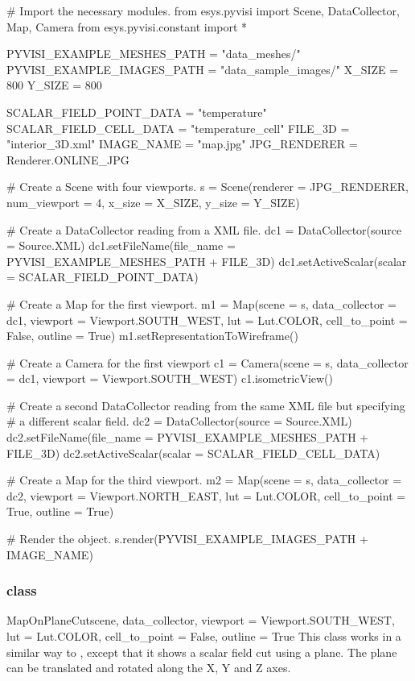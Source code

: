 \begin{python}
# Import the necessary modules.
from esys.pyvisi import Scene, DataCollector, Map, Camera
from esys.pyvisi.constant import *

PYVISI_EXAMPLE_MESHES_PATH = "data_meshes/"
PYVISI_EXAMPLE_IMAGES_PATH = "data_sample_images/"
X_SIZE = 800
Y_SIZE = 800

SCALAR_FIELD_POINT_DATA = "temperature"
SCALAR_FIELD_CELL_DATA = "temperature_cell"
FILE_3D = "interior_3D.xml"
IMAGE_NAME = "map.jpg"
JPG_RENDERER = Renderer.ONLINE_JPG


# Create a Scene with four viewports.
s = Scene(renderer = JPG_RENDERER, num_viewport = 4, x_size = X_SIZE, 
        y_size = Y_SIZE)

# Create a DataCollector reading from a XML file.
dc1 = DataCollector(source = Source.XML)
dc1.setFileName(file_name = PYVISI_EXAMPLE_MESHES_PATH + FILE_3D)
dc1.setActiveScalar(scalar = SCALAR_FIELD_POINT_DATA)

# Create a  Map for the first viewport.
m1 = Map(scene = s, data_collector = dc1, viewport = Viewport.SOUTH_WEST, 
        lut = Lut.COLOR, cell_to_point = False, outline = True)
m1.setRepresentationToWireframe()

# Create a Camera for the first viewport
c1 = Camera(scene = s, data_collector = dc1, viewport = Viewport.SOUTH_WEST)
c1.isometricView()

# Create a second DataCollector reading from the same XML file but specifying
# a different scalar field.
dc2 = DataCollector(source = Source.XML)
dc2.setFileName(file_name = PYVISI_EXAMPLE_MESHES_PATH + FILE_3D)
dc2.setActiveScalar(scalar = SCALAR_FIELD_CELL_DATA)

# Create a Map for the third viewport.
m2 = Map(scene = s, data_collector = dc2, viewport = Viewport.NORTH_EAST, 
        lut = Lut.COLOR, cell_to_point = True, outline = True)

# Render the object.
s.render(PYVISI_EXAMPLE_IMAGES_PATH + IMAGE_NAME)
\end{python}

\subsubsection{\MapOnPlaneCut class}

\begin{classdesc}{MapOnPlaneCut}{scene, data_collector, 
viewport = Viewport.SOUTH_WEST, lut = Lut.COLOR, cell_to_point = False, 
outline = True}
This class works in a similar way to \Map, except that it shows a scalar 
field cut using a plane. The plane can be translated and rotated along the 
X, Y and Z axes.
\end{classdesc}

